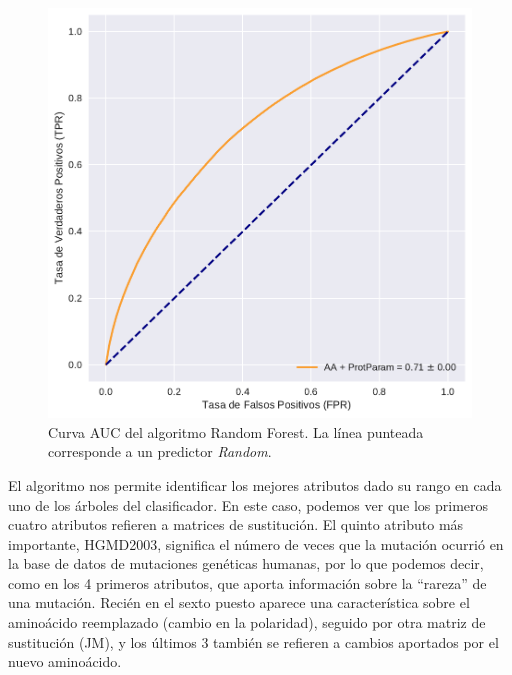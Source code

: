 
\begin{figure}[H]
    \centering
    \includegraphics[scale=0.73]{documents/latex/figures/3/auc_1.pdf}
    \caption{Curva AUC del algoritmo Random Forest. La línea punteada corresponde a un predictor \textit{Random}.}
    \label{fig:auc_1}
\end{figure}




El algoritmo nos permite identificar los mejores atributos dado su rango en cada uno de los árboles del clasificador. En este caso, podemos ver que los primeros cuatro atributos refieren a matrices de sustitución. El quinto atributo más importante, HGMD2003, significa el número de veces que la mutación ocurrió en la base de datos de mutaciones genéticas humanas, por lo que podemos decir, como en los 4 primeros atributos, que aporta información sobre la ``rareza'' de una mutación. Recién en el sexto puesto aparece una característica sobre el aminoácido reemplazado (cambio en la polaridad), seguido por otra matriz de sustitución (JM), y los últimos 3 también se refieren a cambios aportados por el nuevo aminoácido.

